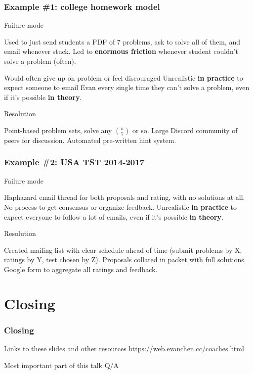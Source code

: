 \documentclass[10pt]{beamer}
\begin{document}
\begin{frame}
  \frametitle{Example \#1: college homework model}
  \begin{alertblock}{Failure mode}
    \begin{itemize}
      \ii Used to just send students a PDF of 7 problems,
      ask to solve all of them, and email whenever stuck.
      \ii Led to \textbf{enormous friction}
      whenever student couldn't solve a problem (often).
      \begin{itemize}
        \ii Would often give up on problem or feel discouraged
        \ii Unrealistic \textbf{in practice}
        to expect someone to email Evan every single time
        they can't solve a problem,
        even if it's possible \textbf{in theory}.
      \end{itemize}
    \end{itemize}
  \end{alertblock}
  \pause
  \begin{exampleblock}{Resolution}
    \begin{itemize}
      \ii Point-based problem sets,
      solve any $\binom n7$ or so.
      \ii Large Discord community of peers for discussion.
      \ii Automated pre-written hint system.
    \end{itemize}
  \end{exampleblock}
\end{frame}

\begin{frame}
  \frametitle{Example \#2: USA TST 2014-2017}
  \begin{alertblock}{Failure mode}
    \begin{itemize}
      \ii Haphazard email thread for both proposals and rating,
      with no solutions at all.
      \ii No process to get consensus or organize feedback.
      \ii Unrealistic \textbf{in practice} to expect
      everyone to follow a lot of emails,
      even if it's possible \textbf{in theory}.
    \end{itemize}
  \end{alertblock}
  \pause
  \begin{exampleblock}{Resolution}
    \begin{itemize}
      \ii Created mailing list with clear schedule ahead of time
      (submit problems by X, ratings by Y, test chosen by Z).
      \ii Proposals collated in packet with full solutions.
      \ii Google form to aggregate all ratings and feedback.
    \end{itemize}
  \end{exampleblock}
\end{frame}

\section{Closing}
\begin{frame}
  \frametitle{Closing}
  \begin{block}{Links to these slides and other resources}
    \url{https://web.evanchen.cc/coaches.html}
  \end{block}

  \bigskip
  \pause

  \begin{block}{Most important part of this talk}
    \LARGE\centering Q/A
  \end{block}
\end{frame}
\end{document}

